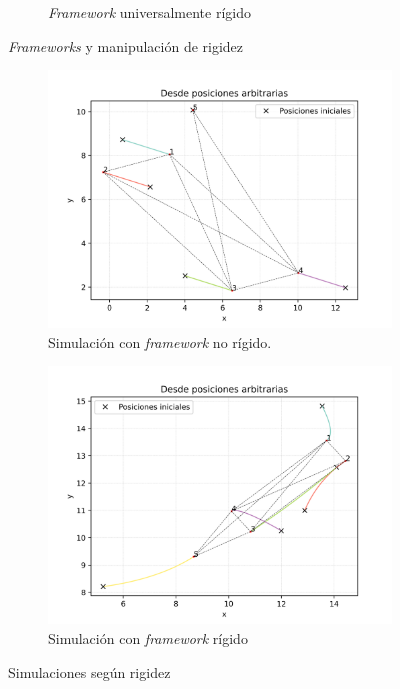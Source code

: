\documentclass[11pt, a4paper]{article} %
\begin{document}
\begin{figure}[h!]
\begin{subfigure}[t]{0.45\textwidth}
\begin{tikzpicture}[scale=1]
            \end{tikzpicture}
            
            \caption{\textit{Framework} universalmente rígido}
            \label{fig:frameworkestable}
        \end{subfigure}
    \caption{\textit{Frameworks} y manipulación de rigidez}

        \centering
        \begin{subfigure}[t]{0.46\textwidth}
            \centering
            \includegraphics[width=\linewidth]{No estabilizable.png}
            \caption{Simulación con \textit{framework} no rígido.}
            \label{fig:simulnoestable}
        \end{subfigure}
        \hspace{0.5cm}
        \begin{subfigure}[t]{0.46\textwidth}
            \centering
            \includegraphics[width=\linewidth]{estabilizable.png}
            \caption{Simulación con \textit{framework} rígido}
            \label{fig:simulestable}
        \end{subfigure}
        \caption{Simulaciones según rigidez}
\end{figure}
\end{document}

